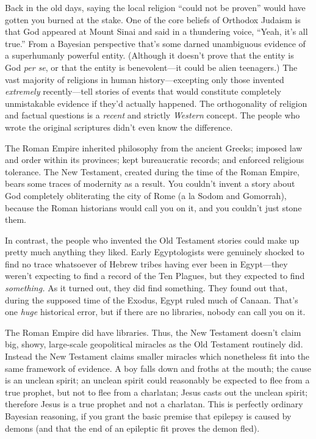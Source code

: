 {
 Back in the old days, saying the local religion
``could not be proven'' would have
gotten you burned at the stake. One of the core beliefs of Orthodox
Judaism is that God appeared at Mount Sinai and said in a thundering
voice, ``Yeah, it's all
true.'' From a Bayesian perspective
that's some darned unambiguous evidence of a
superhumanly powerful entity. (Although it doesn't
prove that the entity is God \textit{per se}, or that the entity is
benevolent---it could be alien teenagers.) The vast majority of
religions in human history---excepting only those invented
\textit{extremely} recently---tell stories of events that would
constitute completely unmistakable evidence if they'd
actually happened. The orthogonality of religion and factual questions
is a \textit{recent} and strictly \textit{Western} concept. The people
who wrote the original scriptures didn't even know the
difference.}

{
 The Roman Empire inherited philosophy from the ancient Greeks;
imposed law and order within its provinces; kept bureaucratic records;
and enforced religious tolerance. The New Testament, created during the
time of the Roman Empire, bears some traces of modernity as a result.
You couldn't invent a story about God completely
obliterating the city of Rome (a la Sodom and Gomorrah), because the
Roman historians would call you on it, and you couldn't
just stone them.}

{
 In contrast, the people who invented the Old Testament stories
could make up pretty much anything they liked. Early Egyptologists were
genuinely shocked to find no trace whatsoever of Hebrew tribes having
ever been in Egypt---they weren't expecting to find a
record of the Ten Plagues, but they expected to find
\textit{something.} As it turned out, they did find something. They
found out that, during the supposed time of the Exodus, Egypt ruled
much of Canaan. That's one \textit{huge} historical
error, but if there are no libraries, nobody can call you on it.}

{
 The Roman Empire did have libraries. Thus, the New Testament
doesn't claim big, showy, large-scale geopolitical
miracles as the Old Testament routinely did. Instead the New Testament
claims smaller miracles which nonetheless fit into the same framework
of evidence. A boy falls down and froths at the mouth; the cause is an
unclean spirit; an unclean spirit could reasonably be expected to flee
from a true prophet, but not to flee from a charlatan; Jesus casts out
the unclean spirit; therefore Jesus is a true prophet and not a
charlatan. This is perfectly ordinary Bayesian reasoning, if you grant
the basic premise that epilepsy is caused by demons (and that the end
of an epileptic fit proves the demon fled).}

